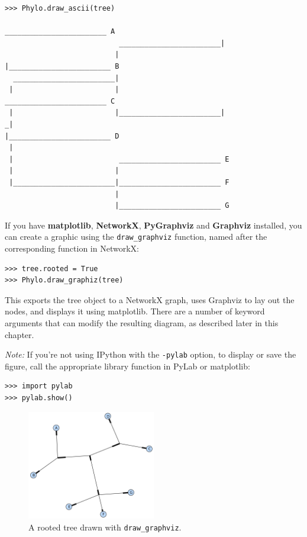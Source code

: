 \documentclass{report}
\begin{document}
\begin{verbatim}
>>> Phylo.draw_ascii(tree)
                                                    ________________________ A
                           ________________________|
                          |                        |________________________ B
  ________________________|
 |                        |                         ________________________ C
 |                        |________________________|
_|                                                 |________________________ D
 |
 |                         ________________________ E
 |                        |
 |________________________|________________________ F
                          |
                          |________________________ G

\end{verbatim}

If you have \textbf{matplotlib}, \textbf{NetworkX}, \textbf{PyGraphviz} and \textbf{Graphviz}
installed, you can create a graphic using the \verb|draw_graphviz| function, named after the
corresponding function in NetworkX:

\begin{verbatim}
>>> tree.rooted = True
>>> Phylo.draw_graphiz(tree)
\end{verbatim}

This exports the tree object to a NetworkX graph, uses Graphviz to lay out the nodes, and
displays it using matplotlib. There are a number of keyword arguments that can modify the
resulting diagram, as described later in this chapter.

\textit{Note:} If you're not using IPython with the \verb|-pylab| option, to display or save
the figure, call the appropriate library function in PyLab or matplotlib:

\begin{verbatim}
>>> import pylab
>>> pylab.show()
\end{verbatim}


\begin{htmlonly}
\label{fig:phylo-rooted}
\end{htmlonly}

\begin{latexonly}
\begin{figure}[htb]
\centering
\includegraphics[width=0.5\textwidth]{images/phylo-rooted.png}
\caption{A rooted tree drawn with {\tt draw\_graphviz}.}
\label{fig:phylo-rooted}
\end{figure}
\end{latexonly}
\end{document}
